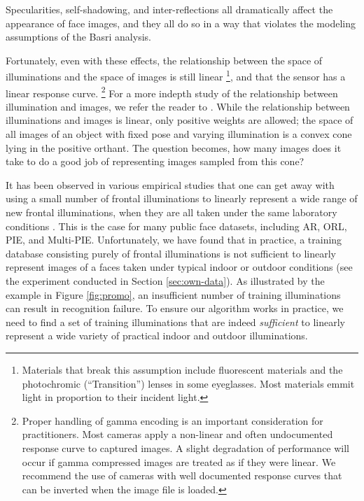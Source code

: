 \documentclass[12pt,journal,draftcls,letterpaper,onecolumn]{IEEEtran}
\begin{document}
Specularities, self-shadowing, and inter-reflections all dramatically affect the appearance of face images,
and they all do so in a way that violates the modeling assumptions of the Basri analysis.

Fortunately, even with these effects, the relationship between the space of
illuminations and the space of images is still linear
\footnote{Materials that break
this assumption include fluorescent materials and the photochromic (``Transition'') lenses
in some eyeglasses.  Most materials emmit light in proportion to their
incident light.}, 
and that the sensor has a linear response curve. 
\footnote{ Proper handling of gamma encoding is an important consideration for
practitioners.  Most cameras apply a non-linear and often undocumented response
curve to captured images.  A slight degradation of performance will occur if
gamma compressed images are treated as if they were linear.  We recommend the use
of cameras with well documented response curves that can be inverted when the 
image file is loaded.}
For a more indepth study 
of the relationship between illumination and images, we refer the reader to
\cite{belhumeur1998set}.
While the relationship between illuminations and images is linear,
only positive weights are allowed; the space of all images of an object with
fixed pose and varying illumination is a convex cone lying in the positive
orthant. The question becomes, how many images does it take to do a good job
of representing images sampled from this cone?

It has been observed in various empirical studies that
one can get away with using a small number of frontal
illuminations to linearly represent a wide range of new frontal
illuminations, when they are all taken under the same laboratory conditions
\cite{Georghiades2001-PAMI}. This is the case for many public
face datasets, including AR, ORL, PIE, and Multi-PIE.
Unfortunately, we have found that in practice, a training
database consisting purely of frontal illuminations is not
sufficient to linearly represent images of a faces taken
under typical indoor or outdoor conditions (see the experiment
conducted in Section \ref{sec:own-data}). As illustrated by the
example in Figure \ref{fig:promo}, an insufficient number of
training illuminations can result in recognition failure. To
ensure our algorithm works in practice, we need to find a set
of training illuminations that are indeed {\em sufficient} to
linearly represent a wide variety of practical indoor and
outdoor illuminations.
\end{document}

